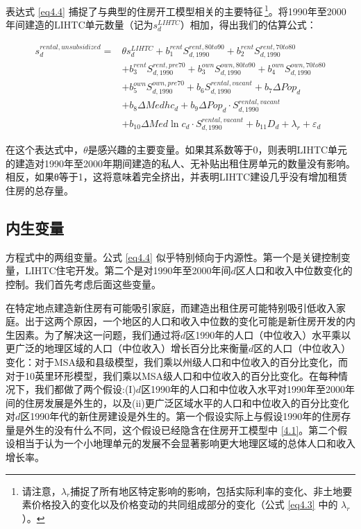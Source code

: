 \documentclass[lang=cn,11pt,a4paper]{paper}
\begin{document}
表达式 \eqref{eq4.4} 捕捉了与典型的住房开工模型相关的主要特征\,\footnote{请注意，$\lambda_{r}$捕捉了所有地区特定影响的影响，包括实际利率的变化、非土地要素价格投入的变化以及价格变动的共同组成部分的变化（公式 \eqref{eq4.3} 中的 $\lambda_{r}$）。}。将1990年至2000年间建造的LIHTC单元数量（记为$s_d^{LIHTC}$）相加，得出我们的估算公式：

\begin{equation}\label{eq4.5}
  \begin{aligned}
    s_{d}^{rental,unsubsidized}=& \theta s_{d}^{LIHTC}+b_{1}^{rent} S_{d, 1990}^{rent, 80 to 90}+b_{2}^{rent} S_{d, 1990}^{rent, 70 t o 80} \\
    &+b_{3}^{rent } S_{d, 1990}^{rent , pre 70}+b_{3}^{own} S_{d, 1990}^{own, 80 to90}+b_{4}^{own } S_{d, 1990}^{own, 70 to 80} \\
    &+b_{5}^{own} S_{d, 1990}^{own,pre70}+b_{6} S_{d, 1990}^{rental,vacant}+b_{7} \Delta P o p_{d} \\
    &+b_{8} \Delta M e d h c_{d}+b_{9} \Delta P o p_{d} \cdot S_{d, 1990}^{rental, vacant} \\
    &+b_{10} \Delta M e d \ln c_{d} \cdot S_{d, 1990}^{rental, vacant}+b_{11} D_{d}+\lambda_{r}+\varepsilon_{d}
    \end{aligned}
\end{equation}

在这个表达式中，$\theta$是感兴趣的主要变量。如果其系数等于0，则表明LIHTC单元的建造对1990年至2000年期间建造的私人、无补贴出租住房单元的数量没有影响。相反，如果θ等于1，这将意味着完全挤出，并表明LIHTC建设几乎没有增加租赁住房的总存量。

\subsection{内生变量}

方程式中的两组变量。公式 \eqref{eq4.4} 似乎特别倾向于内源性。第一个是关键控制变量，LIHTC住宅开发。第二个是对1990年至2000年间$d$区人口和收入中位数变化的控制。我们首先考虑后面这些变量。

在特定地点建造新住房有可能吸引家庭，而建造出租住房可能特别吸引低收入家庭。出于这两个原因，一个地区的人口和收入中位数的变化可能是新住房开发的内生因素。为了解决这一问题，我们通过将$d$区1990年的人口（中位收入）水平乘以更广泛的地理区域的人口（中位收入）增长百分比来衡量$d$区的人口（中位收入）变化：对于MSA级和县级模型，我们乘以州级人口和中位收入的百分比变化，而对于10英里环形模型，我们乘以MSA级人口和中位收入的百分比变化。在每种情况下，我们都做了两个假设:(I)$d$区1990年的人口和中位收入水平对1990年至2000年间的住房发展是外生的，以及(ii)更广泛区域水平的人口和中位收入的百分比变化对$d$区1990年代的新住房建设是外生的。第一个假设实际上与假设1990年的住房存量是外生的没有什么不同，这个假设已经隐含在住房开工模型中 \eqref{4.1}。第二个假设相当于认为一个小地理单元的发展不会显著影响更大地理区域的总体人口和收入增长率。
\end{document}
